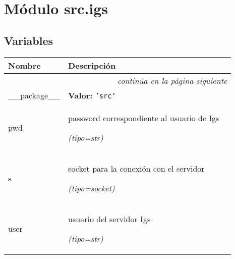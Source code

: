 %
%
%


\section{Módulo src.igs}

    \label{src:igs}


  \subsection{Variables}

    \vspace{-1cm}
\hspace{\varindent}\begin{longtable}{|p{\varnamewidth}|p{\vardescrwidth}|l}
\cline{1-2}
\cline{1-2} \centering \textbf{Nombre} & \centering \textbf{Descripción}& \\
\cline{1-2}
\endhead\cline{1-2}\multicolumn{3}{r}{\small\textit{continúa en la página siguiente}}\\\endfoot\cline{1-2}
\endlastfoot\raggedright \_\-\_\-p\-a\-c\-k\-a\-g\-e\-\_\-\_\- & \raggedright \textbf{Valor:} 
{\tt \texttt{'}\texttt{src}\texttt{'}}&\\
\cline{1-2}
\raggedright p\-w\-d\- & \raggedright password correspondiente al usuario de Igs

            {\it (tipo=str)}&\\
\cline{1-2}
\raggedright s\- & \raggedright socket para la conexión con el servidor

            {\it (tipo=socket)}&\\
\cline{1-2}
\raggedright u\-s\-e\-r\- & \raggedright usuario del servidor Igs

            {\it (tipo=str)}&\\
\cline{1-2}
\end{longtable}


